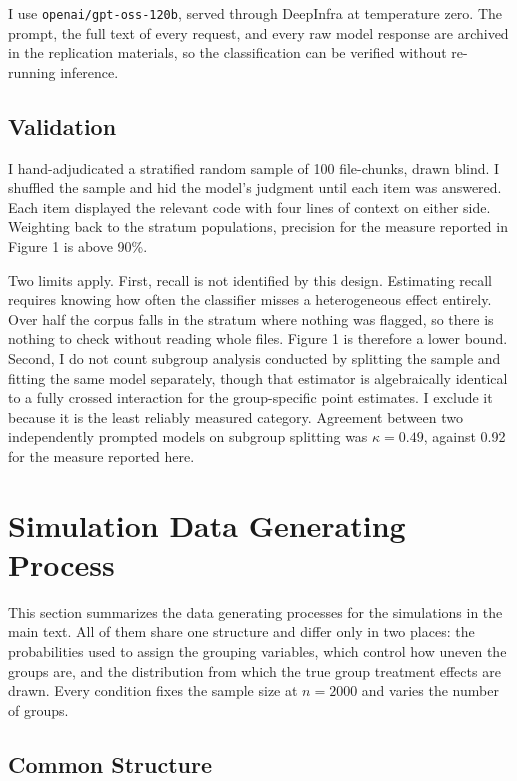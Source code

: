 \documentclass[12pt]{article}
\begin{document}
I use \texttt{openai/gpt-oss-120b}, served through DeepInfra at temperature zero.
The prompt, the full text of every request, and every raw model response are archived in the replication materials, so the classification can be verified without re-running inference.

\subsection{Validation}

I hand-adjudicated a stratified random sample of 100 file-chunks, drawn blind. I shuffled the sample and hid the model's judgment until each item was answered.
Each item displayed the relevant code with four lines of context on either side.
Weighting back to the stratum populations, precision for the measure reported in Figure 1 is above 90\%.

Two limits apply.
First, recall is not identified by this design.
Estimating recall requires knowing how often the classifier misses a heterogeneous effect entirely. Over half the corpus falls in the stratum where nothing was flagged, so there is nothing to check without reading whole files.
Figure 1 is therefore a lower bound.
Second, I do not count subgroup analysis conducted by splitting the sample and fitting the same model separately, though that estimator is algebraically identical to a fully crossed interaction for the group-specific point estimates.
I exclude it because it is the least reliably measured category. Agreement between two independently prompted models on subgroup splitting was $\kappa = 0.49$, against 0.92 for the measure reported here.


\section{Simulation Data Generating Process}

This section summarizes the data generating processes for the simulations in the main text.
All of them share one structure and differ only in two places: the probabilities used to assign the grouping variables, which control how uneven the groups are, and the distribution from which the true group treatment effects are drawn.
Every condition fixes the sample size at $n = 2000$ and varies the number of groups.

\subsection{Common Structure}
\end{document}
